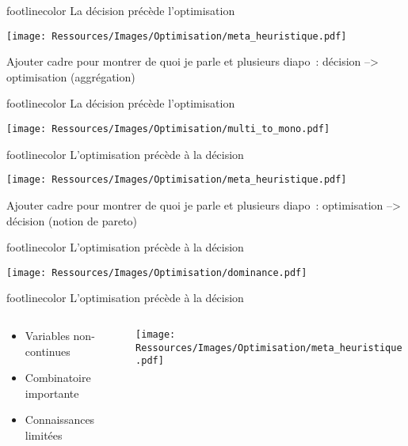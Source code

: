 \documentclass[xcolor=x11names, compress, 11pt]{beamer}
\newcommand{\addsubtitle}[1]{%
\begin{beamercolorbox}[sep=2pt,center,shadow=true,rounded=true]{footlinecolor}
    #1\par%
\end{beamercolorbox}%
}
\begin{document}
\begin{frame}[c]
    \addsubtitle{La décision précède l’optimisation}
    \vfill
    \centering
    \texttt{[image: Ressources/Images/Optimisation/meta\_heuristique.pdf]}
    \vfill

Ajouter cadre pour montrer de quoi je parle et plusieurs diapo~: décision --> optimisation (aggrégation)
\end{frame}

\begin{frame}[c]
    \addsubtitle{La décision précède l’optimisation}
    \vfill
    \centering
    \texttt{[image: Ressources/Images/Optimisation/multi\_to\_mono.pdf]}
    \vfill
\end{frame}

\begin{frame}[c]
    \addsubtitle{L’optimisation précède à la décision}
    \vfill
    \centering
    \texttt{[image: Ressources/Images/Optimisation/meta\_heuristique.pdf]}
    \vfill

Ajouter cadre pour montrer de quoi je parle et plusieurs diapo~: optimisation --> décision (notion de pareto)
\end{frame}

\begin{frame}[c]
    \addsubtitle{L’optimisation précède à la décision}
    \vfill
    \centering
    \texttt{[image: Ressources/Images/Optimisation/dominance.pdf]}
    \vfill
\end{frame}


\begin{frame}[c]
    \addsubtitle{L’optimisation précède à la décision}
    \vfill
    \centering
    \begin{columns}
        \begin{column}{0.5\textwidth}
            \begin{center}
                \begin{itemize}
                    \item Variables non-continues
                    \item Combinatoire importante
                    \item Connaissances limitées
                \end{itemize}
            \end{center}
        \end{column}%
        \begin{column}{0.5\textwidth}
            \texttt{[image: Ressources/Images/Optimisation/meta\_heuristique.pdf]}
        \end{column}%
    \end{columns}%
    \vfill

\end{frame}
\end{document}
